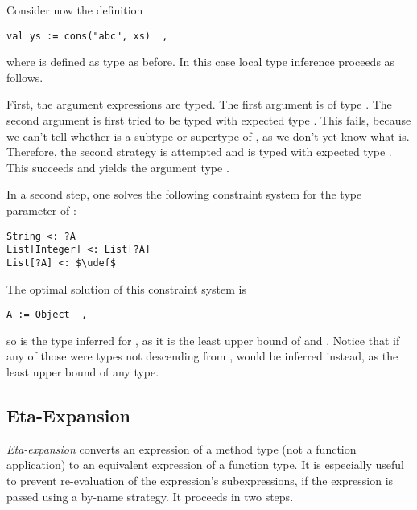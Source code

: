 \example Consider now the definition
\begin{lstlisting}
val ys := cons("abc", xs)  ,
\end{lstlisting}
where  is defined as type  as before. In this case local type inference proceeds as follows.

First, the argument expressions are typed. The first argument  is of type . The second argument  is first tried to be typed with expected type . This fails, because we can't tell whether  is a subtype or supertype of , as we don't yet know what  is. Therefore, the second strategy is attempted and  is typed with expected type . This succeeds and yields the argument type .

In a second step, one solves the following constraint system for the type parameter  of :
\begin{lstlisting}
String <: ?A
List[Integer] <: List[?A]
List[?A] <: $\udef$
\end{lstlisting}

The optimal solution of this constraint system is
\begin{lstlisting}
A := Object  ,
\end{lstlisting}
so  is the type inferred for , as it is the least upper bound of  and . Notice that if any of those were types not descending from ,  would be inferred instead, as the least upper bound of any type. 





\subsection{Eta-Expansion}
\label{sec:eta-expansion}

{\em Eta-expansion} converts an expression of a method type (not a function application) to an equivalent expression of a function type. It is especially useful to prevent re-evaluation of the expression's subexpressions, if the expression is passed using a by-name strategy. It proceeds in two steps. 

